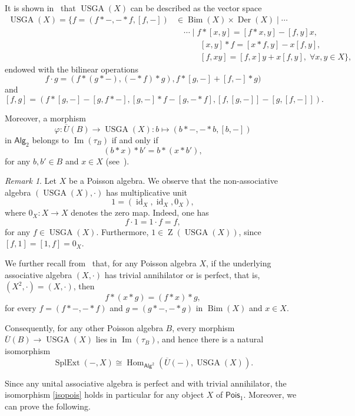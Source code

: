 \documentclass[reqno,a4paper]{amsart}
\theoremstyle{plain}
\theoremstyle{definition}
\theoremstyle{remark}
\newtheorem{remark}[subsection]{Remark}
\numberwithin{equation}{section}
\DeclareMathOperator{\Hom}{Hom}
\DeclareMathOperator{\Bim}{Bim}
\DeclareMathOperator{\SplExt}{SplExt}
\DeclareMathOperator{\Imm}{Im}
\DeclareMathOperator{\Der}{Der}
\DeclareMathOperator{\bZ}{Z}
\DeclareMathOperator{\USGA}{USGA}
\DeclareMathOperator{\id}{id}
\newcommand{\Pois}{\ensuremath{\mathsf{Pois}}}
\newcommand{\Alg}{\ensuremath{\mathsf{Alg}}}
\begin{document}
It is shown in~\cite[Theorem 5.6]{CigoliManciniMetere} that $\USGA(X)$ can be described as the vector space
\begin{align*}
\USGA(X)=\{ f=(f \ast -,- \ast f,[f,-]) &\in \Bim(X)\times \Der(X) \mid \cdots \\
&\quad \cdots \mid f \ast [x,y]=[f \ast x,y]-[f,y]x, \\
&\qquad\quad [x,y] \ast f=[x \ast f,y]-x[f,y], \\
&\qquad\quad [f,xy]=[f,x]y+x[f,y], \; \forall x,y \in X \},
\end{align*}
endowed with the bilinear operations
\[
f \cdot g=(f \ast (g \ast -), (- \ast f) \ast g), f \ast [g,-] + [f,-] \ast g)
\]
and
\[
[f,g]=(f \ast [g,-] - [g,f \ast -], [g,-] \ast f - [g,- \ast f], [f,[g,-]]-[g,[f,-]]).
\]

Moreover, a morphism 
\[
\varphi \colon \overline{U}(B) \to \USGA(X) \colon b \mapsto (b \ast -, - \ast b, [b,-])
\]
in $\Alg_2$ belongs to $\Imm(\tau_B)$ if and only if 
\begin{equation}\label{eq_pois}
(b \ast x) \ast b' = b \ast (x \ast b'),
\end{equation}
for any $b,b' \in B$ and $x \in X$ (see~\cite[Theorem 5.6]{CigoliManciniMetere}).

\begin{remark}
Let $X$ be a Poisson algebra. We observe that the non-associative algebra $(\USGA(X),\cdot)$ has multiplicative unit
\[
1=(\id_X,\id_X,0_X),
\]
where $0_X \colon X \to X$ denotes the zero map. Indeed, one has
\[
f \cdot 1=1 \cdot f=f,
\]
for any $f \in \USGA(X)$. Furthermore, $1 \in \bZ(\USGA(X))$, since $[f,1]=[1,f]=0_X$.
\end{remark}

We further recall from~\cite[Remark 5.8]{CigoliManciniMetere} that, for any Poisson algebra $X$, if the underlying associative algebra $(X,\cdot)$ has trivial annihilator or is perfect, that is, $(X^2,\cdot)=(X,\cdot)$, then
\[
f \ast (x \ast g) = (f \ast x) \ast g,
\]
for every $f=(f \ast -, - \ast f)$ and $g=(g \ast -,- \ast g)$ in $\Bim(X)$ and $x \in X$.

Consequently, for any other Poisson algebra $B$, every morphism $\overline{U}(B) \to \USGA(X)$ lies in $\Imm(\tau_B)$, and hence there is a natural isomorphism
\begin{equation}\label{isopois}
\SplExt(-,X)\cong \Hom_{\Alg^{2}}(\overline{U}(-),\USGA(X)).
\end{equation}

Since any unital associative algebra is perfect and with trivial annihilator, the isomorphism \eqref{isopois} holds in particular for any object $X$ of $\Pois_1$. Moreover, we can prove the following.
\end{document}

